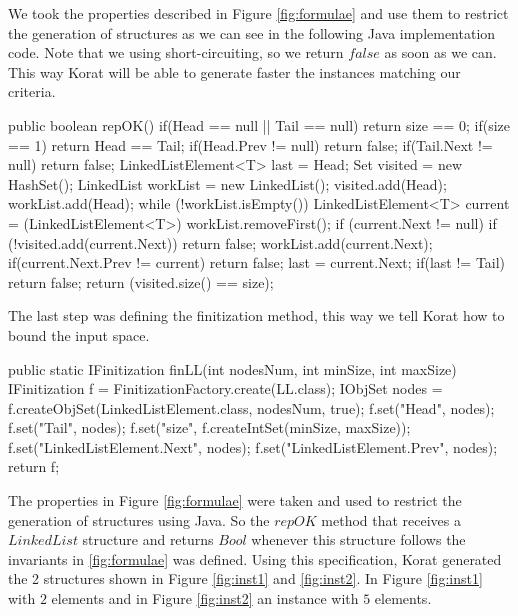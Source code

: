 We took the properties described in Figure \ref{fig:formulae} and use them to restrict the generation of structures as we can see in the following Java implementation code.
Note that we using short-circuiting, so we return $false$ as soon as we can. This way Korat will be able to generate faster the instances matching our criteria.

\begin{code}
public boolean repOK() {
  if(Head == null || Tail == null)
    return size == 0;
  if(size == 1) return Head == Tail;
  if(Head.Prev != null) return false;
  if(Tail.Next != null) return false;
  LinkedListElement<T> last = Head;
  Set visited = new HashSet();
  LinkedList workList = new LinkedList();
  visited.add(Head);
  workList.add(Head);
  while (!workList.isEmpty()) {
    LinkedListElement<T> current = (LinkedListElement<T>) workList.removeFirst();
    if (current.Next != null) {
      if (!visited.add(current.Next))
	    return false;
      workList.add(current.Next);
      if(current.Next.Prev != current) return false;
      last = current.Next;
    }
  }
  if(last != Tail)
    return false;
  return (visited.size() == size);
}
\end{code}

The last step was defining the finitization method, this way we tell Korat how to bound the input space.

\begin{code}
public static IFinitization finLL(int nodesNum, int minSize, int maxSize) {
  IFinitization f = FinitizationFactory.create(LL.class);
  IObjSet nodes = f.createObjSet(LinkedListElement.class, nodesNum, true);
  f.set("Head", nodes);
  f.set("Tail", nodes);
  f.set("size", f.createIntSet(minSize, maxSize));
  f.set("LinkedListElement.Next", nodes);
  f.set("LinkedListElement.Prev", nodes);
  return f;
}
\end{code}

The properties in Figure \ref{fig:formulae} were taken and used to restrict the generation of structures using Java. So the $repOK$ method that receives
a $LinkedList$ structure and returns $Bool$ whenever this structure follows the invariants in \ref{fig:formulae} was defined.
Using this specification, Korat generated the 2 structures shown in Figure \ref{fig:inst1} and \ref{fig:inst2}. In Figure \ref{fig:inst1} with $2$ elements
and in Figure \ref{fig:inst2} an instance with $5$ elements.

%


